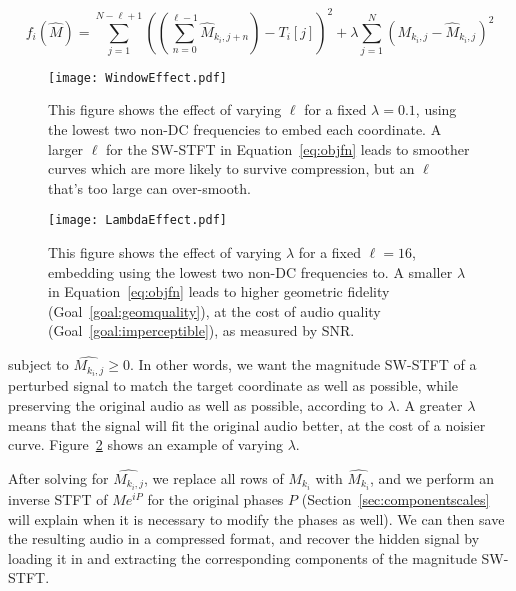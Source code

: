 \documentclass[runningheads]{llncs}
\begin{document}
\begin{equation}
  \label{eq:objfn}
  f_i(\hat{M}) = \sum_{j=1}^{N-\ell+1} \left( \left( \sum_{n = 0}^{\ell-1} \hat{M}_{k_i, j+n} \right) - T_i[j] \right)^2 + \lambda \sum_{j=1}^N \left( M_{k_i, j} - \hat{M}_{k_i, j} \right)^2
\end{equation}



\begin{figure}
  \centering
  \texttt{[image: WindowEffect.pdf]}
  \caption{This figure shows the effect of varying $\ell$ for a fixed $\lambda=0.1$, using the lowest two non-DC frequencies to embed each coordinate.  A larger $\ell$ for the SW-STFT in Equation~\ref{eq:objfn} leads to smoother curves which are more likely to survive compression, but an $\ell$ that's too large can over-smooth.}
  \label{fig:WindowEffect}
\end{figure}

\begin{figure}
  \centering
  \texttt{[image: LambdaEffect.pdf]}
  \caption{This figure shows the effect of varying $\lambda$ for a fixed $\ell=16$, embedding using the lowest two non-DC frequencies to.  A smaller $\lambda$ in Equation~\ref{eq:objfn} leads to higher geometric fidelity (Goal~\ref{goal:geomquality}), at the cost of audio quality (Goal~\ref{goal:imperceptible}), as measured by SNR.}
  \label{fig:LambdaEffect}
\end{figure}



subject to $\hat{M_{k_i, j}} \geq 0$.  In other words, we want the magnitude SW-STFT of a perturbed signal to match the target coordinate as well as possible, while preserving the original audio as well as possible, according to $\lambda$.  A greater $\lambda$ means that the signal will fit the original audio better, at the cost of a noisier curve.  Figure~\ref{fig:LambdaEffect} shows an example of varying $\lambda$.

After solving for $\hat{M_{k_i, j}}$, we replace all rows of $M_{k_i}$ with $\hat{M_{k_i}}$, and we perform an inverse STFT of $M e^{i P}$ for the original phases $P$ (Section~\ref{sec:componentscales} will explain when it is necessary to modify the phases as well).  We can then save the resulting audio in a compressed format, and recover the hidden signal by loading it in and extracting the corresponding components of the magnitude SW-STFT.
\end{document}
